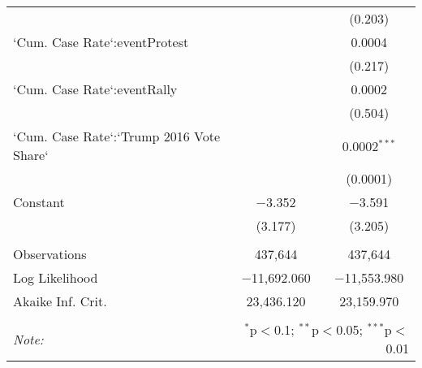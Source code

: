 \begin{table}[!htbp]
\begin{tabular}{@{\extracolsep{5pt}}lcc}
  &  & (0.203) \\ 
  `Cum. Case Rate`:eventProtest &  & 0.0004 \\ 
  &  & (0.217) \\ 
  `Cum. Case Rate`:eventRally &  & 0.0002 \\ 
  &  & (0.504) \\ 
  `Cum. Case Rate`:`Trump 2016 Vote Share` &  & 0.0002$^{***}$ \\ 
  &  & (0.0001) \\ 
  Constant & $-$3.352 & $-$3.591 \\ 
  & (3.177) & (3.205) \\ 
 \hline \\[-1.8ex] 
Observations & 437,644 & 437,644 \\ 
Log Likelihood & $-$11,692.060 & $-$11,553.980 \\ 
Akaike Inf. Crit. & 23,436.120 & 23,159.970 \\ 
\hline 
\hline \\[-1.8ex] 
\textit{Note:}  & \multicolumn{2}{r}{$^{*}$p$<$0.1; $^{**}$p$<$0.05; $^{***}$p$<$0.01} \\ 
\end{tabular} 
\end{table} 
